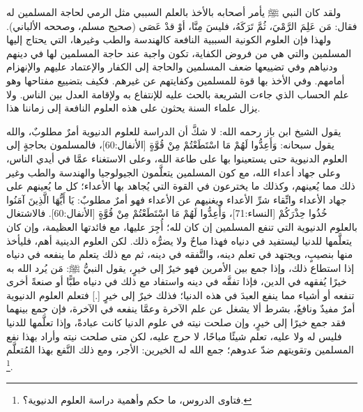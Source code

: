 ولقد كان النبي ﷺ يأمر أصحابه بالأخذ بالعلم السببي مثل الرمي لحاجة المسلمين له فقال: مَن عَلِمَ الرَّمْيَ، ثُمَّ تَرَكَهُ، فليسَ مِنَّا، أوْ قدْ عَصَى {\footnotesize (صحيح مسلم، وصححه الألباني)}. ولهذا فإن العلوم الكونية السببية النافعة كالهندسة والطب وغيرها، التي يحتاج إليها المسلمين والتي هي من فروض الكفاية، تكون واجبة عند حاجة المسلمين لها في دينهم ودنياهم وفي تضييعها ضعف المسلمين والحاجة إلى الكفار والإعتماد عليهم والإنهزام أمامهم. وفي الأخذ بها قوة للمسلمين وكفايتهم عن غيرهم. فكيف بتضييع مفتاحها وهو علم الحساب الذي جاءت الشريعة بالحث عليه للإنتفاع به ولإقامة العدل بين الناس. ولا يزال علماء السنة يحثون على هذه العلوم النافعة إلى زماننا هذا. 

 يقول الشيخ ابن باز رحمه الله: لا شكَّ أن الدراسة للعلوم الدنيوية أمرٌ مطلوبٌ، والله يقول سبحانه: وَأَعِدُّوا لَهُمْ مَا اسْتَطَعْتُمْ مِنْ قُوَّةٍ [الأنفال:60]، فالمسلمون بحاجةٍ إلى العلوم الدنيوية حتى يستعينوا بها على طاعة الله، وعلى الاستغناء عمَّا في أيدي الناس، وعلى جهاد أعداء الله، مع كون المسلمين يتعلَّمون الجيولوجيا والهندسة والطب وغير ذلك مما يُعينهم، وكذلك ما يخترعون في القوة التي يُجاهد بها الأعداء؛ كل ما يُعينهم على جهاد الأعداء واتِّقاء شرِّ الأعداء ويغنيهم عن الأعداء فهو أمرٌ مطلوبٌ: يَا أَيُّهَا الَّذِينَ آمَنُوا خُذُوا حِذْرَكُمْ [النساء:71]، وَأَعِدُّوا لَهُمْ مَا اسْتَطَعْتُمْ مِنْ قُوَّةٍ [الأنفال:60]. فالاشتغال بالعلوم الدنيوية التي تنفع المسلمين إن كان لله؛ أُجِرَ عليها، مع فائدتها العظيمة، وإن كان يتعلَّمها للدنيا ليستفيد في دنياه فهذا مباحٌ ولا يضرُّه ذلك. لكن العلوم الدينية أهم، فليأخذ منها بنصيبٍ، ويجتهد في تعلم دينه، والتَّفقه في دينه، ثم مع ذلك يتعلم ما ينفعه في دنياه إذا استطاع ذلك، وإذا جمع بين الأمرين فهو خيرٌ إلى خيرٍ، يقول النبيُّ ﷺ: مَن يُرد الله به خيرًا يُفقهه في الدين، فإذا تفقَّه في دينه واستفاد مع ذلك في دنياه طبًّا أو صنعةً أخرى تنفعه أو أشياء مما ينفع العبدَ في هذه الدنيا؛ فذلك خيرٌ إلى خيرٍ [.] فتعلم العلوم الدنيوية أمرٌ مفيدٌ ونافعٌ، بشرط ألا يشغل عن علم الآخرة وعمَّا ينفعه في الآخرة، فإن جمع بينهما فقد جمع خيرًا إلى خيرٍ، وإن صلحت نيته في علوم الدنيا كانت عبادةً، وإذا تعلَّمها للدنيا فليس له ولا عليه، تعلم شيئًا مباحًا، لا حرج عليه، لكن متى صلحت نيته وأراد بهذا نفع المسلمين وتقويتهم ضدّ عدوهم؛ جمع الله له الخيرين: الأجر، ومع ذلك النَّفع بهذا المُتعلَّم \href{https://www.youtube.com/watch?v=soOBNJPR0E8}{\faExternalLink}.\footnote{فتاوى الدروس، ما حكم وأهمية دراسة العلوم الدنيوية؟.}


